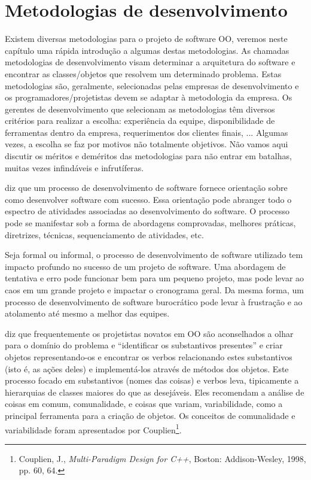 \documentclass[
	11pt,				%
	openright,
	twoside,			%
	a4paper,			%
	english,			%
	french,
	brazil,				%
	sumario=tradicional
	]{abntex2}
\begin{document}


\chapter{Metodologias de desenvolvimento}

Existem diversas metodologias para o projeto de software OO, veremos neste capítulo uma rápida introdução a algumas destas metodologias. As chamadas metodologias de desenvolvimento visam determinar a arquitetura do software e encontrar as classes/objetos que resolvem um determinado problema. Estas metodologias são, geralmente, selecionadas pelas empresas de desenvolvimento e os programadores/projetistas devem se adaptar à metodologia da empresa. Os gerentes de desenvolvimento que selecionam as metodologias têm diversos critérios para realizar a escolha: experiência da equipe, disponibilidade de ferramentas dentro da empresa, requerimentos dos clientes finais, ... Algumas vezes, a escolha se faz por motivos não totalmente objetivos. Não vamos aqui discutir os méritos e deméritos das metodologias para não entrar em batalhas, muitas vezes infindáveis e infrutíferas.

\cite{uml:j2ee} diz que um processo de desenvolvimento de software fornece orientação sobre como desenvolver software com sucesso. Essa orientação pode abranger todo o espectro de atividades associadas ao desenvolvimento do software. O processo pode se manifestar sob a forma de abordagens comprovadas, melhores práticas, diretrizes, técnicas, sequenciamento de atividades, etc.

Seja formal ou informal, o processo de desenvolvimento de software utilizado tem impacto profundo no sucesso de um projeto de software. Uma abordagem de tentativa e erro pode funcionar bem para um pequeno projeto, mas pode levar ao caos em um grande projeto e impactar o cronograma geral. Da mesma forma, um processo de desenvolvimento de software burocrático pode levar à frustração e ao atolamento até mesmo a melhor das equipes.

\cite{DP:explained} diz que frequentemente os projetistas novatos em OO são aconselhados a olhar para o domínio do problema e ``identificar os substantivos presentes'' e criar objetos representando-os e encontrar os verbos relacionando estes substantivos (isto é, as ações deles) e implementá-los através de métodos dos objetos. Este processo focado em substantivos (nomes das coisas) e verbos leva, tipicamente a hierarquias de classes maiores do que as desejáveis. Eles recomendam a análise de coisas em comum, comunalidade, e coisas que variam, variabilidade, como a principal ferramenta para a criação de objetos. Os conceitos de comunalidade e variabilidade foram apresentados por Couplien\footnote{Couplien, J., \textit{Multi-Paradigm Design for C++}, Boston: Addison-Wesley, 1998, pp. 60, 64.}.
\end{document}
